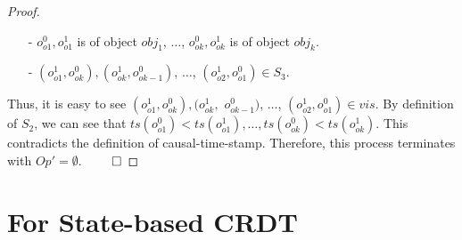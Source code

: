 {\begin {proof}
\begin{itemize}
\setlength{\itemsep}{0.5pt}
\item[-] $o^{0}_{\mathit{o1}}, o^{1}_{\mathit{o1}}$ is of object $\mathit{obj}_1$, $\ldots$, $o^{0}_{\mathit{ok}}, o^{1}_{\mathit{ok}}$ is of object $\mathit{obj}_k$.

\item[-] $(o^{1}_{\mathit{o1}},o^{0}_{\mathit{ok}}), (o^{1}_{\mathit{ok}},o^{0}_{\mathit{ok-1}})$, $\ldots$, $(o^{1}_{\mathit{o2}},o^{0}_{\mathit{o1}}) \in S_3$.
\end{itemize}

Thus, it is easy to see $(o^{1}_{\mathit{o1}},o^{0}_{\mathit{ok}}), (o^{1}_{\mathit{ok}},$ $o^{0}_{\mathit{ok-1}})$, $\ldots$, $(o^{1}_{\mathit{o2}},o^{0}_{\mathit{o1}}) \in \mathit{vis}$. By definition of $S_2$, we can see that $\mathit{ts}(o^{0}_{\mathit{o1}}) < \mathit{ts}(o^{1}_{\mathit{o1}}), \ldots, \mathit{ts}(o^{0}_{\mathit{ok}}) < \mathit{ts}(o^{1}_{\mathit{ok}})$. This contradicts the definition of causal-time-stamp. Therefore, this process terminates with $\mathit{Op}' = \emptyset$. $\qed$
\end {proof}










\section{For State-based CRDT}
\label{sec:for state-based CRDT}

}
